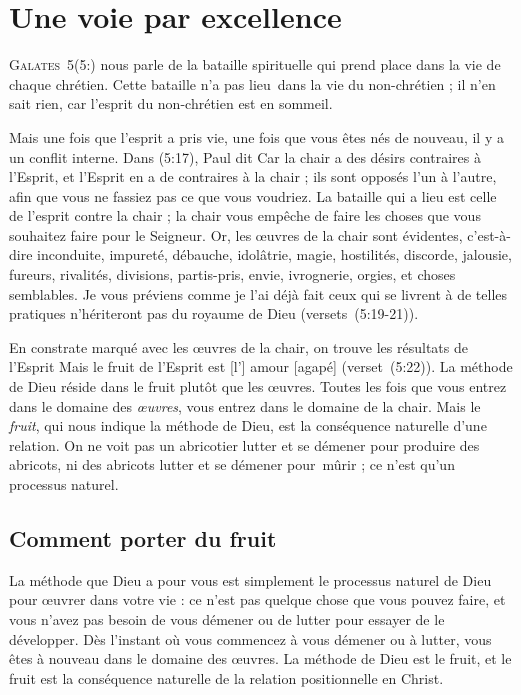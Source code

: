\chapter{Une voie par excellence}

\lettrine{G}{alates~5}(5:) nous parle de
 la bataille spirituelle
 qui prend place dans la vie de chaque chrétien.
 Cette bataille n'a pas lieu~dans la vie du non-chrétien ;
 il n'en sait rien, car l'esprit du non-chrétien est en sommeil.

Mais une fois que l'esprit a pris vie, une fois que vous êtes nés de nouveau,
 il y a un conflit interne. Dans (5:17), Paul dit\frcolon{}
 \Og Car la chair a des désirs contraires à l'Esprit,
 et l'Esprit en a de contraires à la chair ; ils sont opposés l'un à l'autre,
 afin que vous ne fassiez pas ce que vous voudriez. \Fg{}
 La bataille qui a lieu est celle de l'esprit contre la chair ;
 la chair vous empêche de faire les choses que vous souhaitez
 faire pour le Seigneur.
 \Og Or, les œuvres de la chair sont évidentes, c'est-à-dire inconduite,
 impureté, débauche, idolâtrie, magie, hostilités, discorde, jalousie,
 fureurs, rivalités, divisions, partis-pris, envie, ivrognerie, orgies,
 et choses semblables. Je vous préviens comme je l'ai déjà fait\frcolon{}
 ceux qui se livrent à de telles pratiques n'hériteront pas
 du royaume de Dieu \Fg{} (versets~(5:19-21)).

En constrate marqué avec les œuvres de la chair, on trouve les résultats
 de l'Esprit\frcolon{} \Og Mais le fruit de l'Esprit est [l'] amour [agapé] \Fg{}
 (verset~(5:22)). La méthode de Dieu réside dans le fruit
 plutôt que les œuvres. Toutes les fois que vous entrez dans le domaine
 des \emph{œuvres}, vous entrez dans le domaine de la chair.
 Mais le \emph{fruit}, qui nous indique la méthode de Dieu, est la conséquence
 naturelle d'une relation. On ne voit pas un abricotier lutter
 et se démener pour produire des abricots, ni des abricots lutter
 et se démener pour~mûrir ; ce n'est qu'un processus naturel.


\section{Comment porter du fruit}

La méthode que Dieu a pour vous est simplement le processus naturel
 de Dieu pour œuvrer dans votre vie : ce n'est pas quelque chose
 que vous pouvez faire, et vous n'avez pas besoin de vous démener
 ou de lutter pour essayer de le développer.
 Dès l'instant où vous commencez à vous démener ou à lutter,
 vous êtes à nouveau dans le domaine des œuvres.
 La méthode de Dieu est le fruit, et le fruit est la conséquence
 naturelle de la relation positionnelle en Christ.


